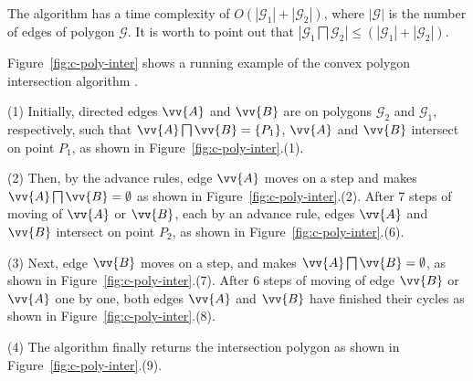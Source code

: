 The algorithm has a time complexity of $O(|\mathcal{G}_1| + |\mathcal{G}_2|)$, where $|\mathcal{G}|$ is the number of edges of polygon $\mathcal{G}$.
It is worth to point out that $|\mathcal{G}_1 \bigsqcap \mathcal{G}_2| \le (|\mathcal{G}_1| + |\mathcal{G}_2|)$.




\begin{example}
Figure~\ref{fig:c-poly-inter} shows a running example of the convex polygon intersection algorithm \cpia.

\sstab(1) Initially, directed edges $\vv{A}$ and $\vv{B}$ are on polygons $\mathcal{G}_2$ and $\mathcal{G}_1$, respectively, such that $\vv{A} \bigsqcap \vv{B} = \{P_1\}$, \ie $\vv{A}$ and $\vv{B}$ intersect on point $P_1$, as shown in Figure~\ref{fig:c-poly-inter}.(1).

\sstab(2) Then, by the advance rules, edge $\vv{A}$ moves on a step and makes $\vv{A} \bigsqcap \vv{B} = \emptyset$ as shown in Figure~\ref{fig:c-poly-inter}.(2).
After 7 steps of moving of $\vv{A}$ or $\vv{B}$, each by an advance rule, edges $\vv{A}$ and $\vv{B}$ intersect on point $P_2$, as shown in Figure~\ref{fig:c-poly-inter}.(6).

\sstab(3) Next, edge $\vv{B}$ moves on a step, and makes $\vv{A} \bigsqcap \vv{B} = \emptyset$, as shown in Figure~\ref{fig:c-poly-inter}.(7).
After 6 steps of moving of edge $\vv{B}$ or $\vv{A}$ one by one, both edges $\vv{A}$ and $\vv{B}$ have finished their cycles as shown in Figure~\ref{fig:c-poly-inter}.(8).

\sstab(4) The algorithm finally returns the intersection polygon as shown in Figure~\ref{fig:c-poly-inter}.(9).
\end{example}





